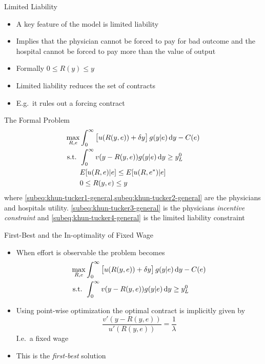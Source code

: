 \documentclass[compress, handout]{beamer}
\begin{document}
\begin{frame}[c]{Limited Liability}
  \begin{itemize}[<+- | alert@+>]
    \item A key feature of the model is limited liability
    \item Implies that the physician cannot be forced to pay for bad outcome and the hospital cannot be forced to pay more than the value of output
    \item Formally $0\leq R(y) \leq y$
    \item Limited liability reduces the set of contracts
    \item E.g.\ it rules out a \citeauthor{Mirrlees1974Notes} forcing contract
  \end{itemize}
\end{frame}

\begin{frame}[c]{The Formal Problem}
  \begin{subequations}
\label{eq:khun-tucker-general}
\begin{align}
    \max_{R,e} & \int_0^{\infty}\left[u(R(y,e))+\delta y\right]g(y|e)\dif y-C(e)\label{subeq:khun-tucker1-general} \\
    \text{s.t. }    & \int_{0}^{\infty} v(y-R(y,e))g(y|e)\dif y\geq y_L^0 \label{subeq:khun-tucker2-general} \\
                    & E[u(R,e)|e]\leq E[u(R,e^*)|e] \label{subeq:khun-tucker3-general}\\
                    & 0\leq R(y,e)\leq y \label{subeq:khun-tucker4-general}
\end{align}
\end{subequations}
where \cref{subeq:khun-tucker1-general,subeq:khun-tucker2-general} are the physicians and hospitals utility. \cref{subeq:khun-tucker3-general} is the physicians \emph{incentive constraint} and \cref{subeq:khun-tucker4-general} is the limited liability constraint
\end{frame}

\begin{frame}[c]{First-Best and the In-optimality of Fixed Wage}
  \begin{itemize}[<+- | alert@+>]
    \item When effort is observable the problem becomes
\begin{align*}
    \max_{R,e} & \int_0^{\infty}\left[u(R(y,e))+\delta y\right]g(y|e)\dif y-C(e)\\
    \text{s.t. } & \int_{0}^{\infty} v(y-R(y,e))g(y|e)\dif y\geq y_L^0 
\end{align*}
    \item Using point-wise optimization the optimal contract is implicitly given by 
    \[
      \frac{v'(y-R(y,e))}{u'(R(y,e))}=\frac{1}{\lambda}
    \]
    I.e.\ a fixed wage
    \item This is the \emph{first-best} solution
  \end{itemize}
\end{frame}
\end{document}
